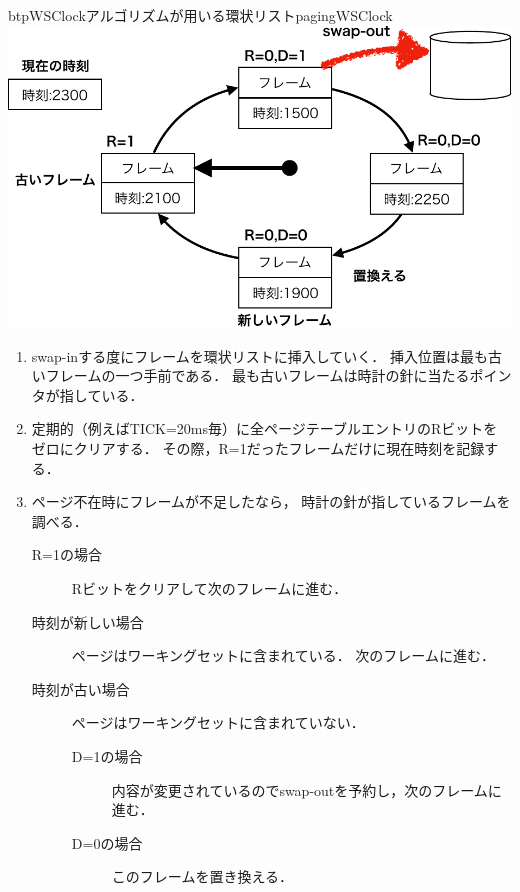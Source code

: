 \begin{myfig}{btp}{WSClockアルゴリズムが用いる環状リスト}{pagingWSClock}
  \includegraphics[scale=0.66]{Fig/pagingWSClock-crop.pdf}
\end{myfig}

\begin{enumerate}
\item swap-inする度にフレームを環状リストに挿入していく．
  挿入位置は最も古いフレームの一つ手前である．
  最も古いフレームは時計の針に当たるポインタが指している．
\item 定期的（例えばTICK=20ms毎）に全ページテーブルエントリのRビットを
  ゼロにクリアする．
  その際，R=1だったフレームだけに現在時刻を記録する．
\item ページ不在時にフレームが不足したなら，
  時計の針が指しているフレームを調べる．
  \begin{description}
  \item[R=1の場合]
    Rビットをクリアして次のフレームに進む．
  \item[時刻が新しい場合]
    ページはワーキングセットに含まれている．
    次のフレームに進む．
  \item[時刻が古い場合]
    ページはワーキングセットに含まれていない．
    \begin{description}
      \item[D=1の場合]
        内容が変更されているのでswap-outを予約し，次のフレームに進む．
      \item[D=0の場合]
        このフレームを置き換える．
    \end{description}
  \end{description}
\end{enumerate}

